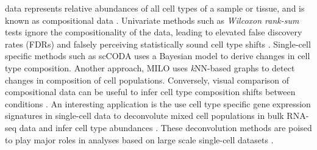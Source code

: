 data represents relative abundances of all cell types of a sample or tissue, and is known as compositional data \textbf{\cite{ostner_compositional_nodate}}. Univariate methods such as \textit{Wilcoxon rank-sum} tests ignore the compositionality of the data, leading to elevated false discovery rates (FDRs) and falsely perceiving statistically sound cell type shifts \textbf{\cite{ostner_compositional_nodate}}. Single-cell specific methods such as scCODA \textbf{\cite{buttner_sccoda_2021}} uses a Bayesian model to derive changes in cell type composition. Another approach, MILO \textbf{\cite{dann_differential_2022}} uses \textit{k}NN-based graphs to detect changes in composition of cell populations. Conversely, visual comparison of compositional data can be useful to infer cell type composition shifts between conditions \textbf{\cite{lueckenmalte_d_current_2019}}. An interesting application is the use cell type specific gene expression signatures in single-cell data to deconvolute mixed cell populations in bulk RNA-seq data and infer cell type abundances \textbf{\cite{newman_robust_2015,newman_determining_2019,chu_cell_2022}}. These deconvolution methods are poised to play major roles in analyses based on large scale single-cell datasets \textbf{\cite{cobos_effective_2023}}. 

